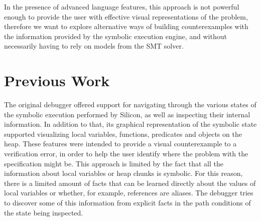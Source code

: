 In the presence of advanced language features, this approach is not powerful
enough to provide the user with effective visual representations of the problem,
therefore we want to explore alternative ways of building counterexamples with
the information provided by the symbolic execution engine, and without
necessarily having to rely on models from the SMT solver.



\section{Previous Work}\label{sec:previous-work}

The original debugger offered support for navigating through the various states
of the symbolic execution performed by Silicon, as well as inspecting their
internal information. In addition to that, its graphical representation of the
symbolic state supported visualizing local variables, functions, predicates and
objects on the heap. These features were intended to provide a visual
counterexample to a verification error, in order to help the user identify where
the problem with the specification might be.  This approach is limited by the
fact that all the information about local variables or heap chunks is symbolic.
For this reason, there is a limited amount of facts that can be learned directly
about the values of local variables or whether, for example, references are
aliases. The debugger tries to discover some of this information from explicit
facts in the path conditions of the state being inspected.



